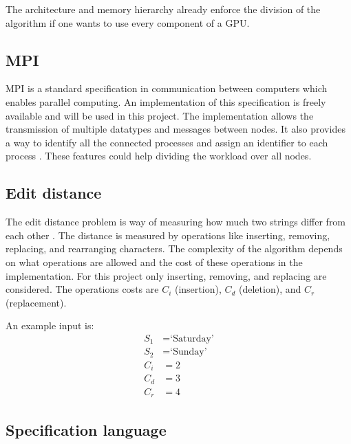 The architecture and memory hierarchy already enforce the division of the algorithm if one wants to use every component of a GPU.

\subsection{MPI}
MPI is a standard specification in communication between computers which enables parallel computing.
An implementation of this specification is freely available and will be used in this project.
The implementation allows the transmission of multiple datatypes and messages between nodes.
It also provides a way to identify all the connected processes and assign an identifier to each process \cite{MPI}.
These features could help dividing the workload over all nodes.

\subsection{Edit distance}
The edit distance problem is way of measuring how much two strings differ from each other \cite{Navarro:2001:GTA:375360.375365}.
The distance is measured by operations like inserting, removing, replacing, and rearranging characters.
The complexity of the algorithm depends on what operations are allowed and the cost of these operations in the implementation.
For this project only inserting, removing, and replacing are considered.
The operations costs are $C_i$ (insertion), $C_d$ (deletion), and $C_r$ (replacement).

An example input is:
\begin{equation} \label{ed}
\begin{split}
S_1 &= \text{`Saturday'}\\
S_2 &= \text{`Sunday'}\\
C_i &= 2\\
C_d &= 3\\
C_r &= 4
\end{split}
\end{equation}


\subsection{Specification language}

